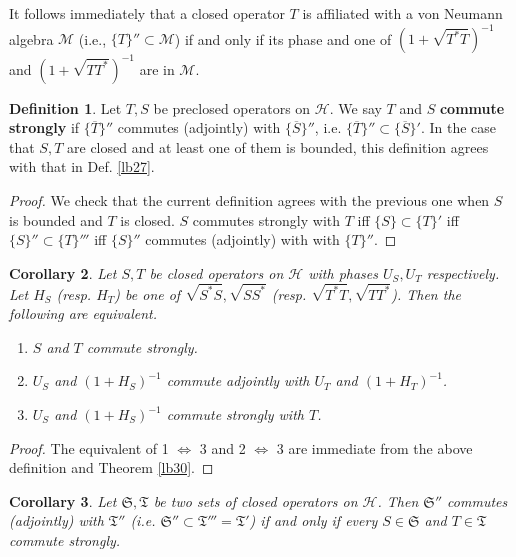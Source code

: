 \documentclass[12pt,a4paper,notitlepage]{article}
\theoremstyle{definition}
\newtheorem{df}{Definition}[section]
\theoremstyle{plain}
\newtheorem{co}[df]{Corollary}
\newcommand{\fk}{\mathfrak}
\newcommand{\mc}{\mathcal}
\newcommand{\ovl}{\overline}
\numberwithin{equation}{section}
\begin{document}
It follows immediately that a closed operator $T$ is affiliated with a von Neumann algebra $\mc M$ (i.e., $\{T\}''\subset\mc M$) if and only if its phase and one of $(1+\sqrt{T^*T})^{-1}$ and $(1+\sqrt{TT^*})^{-1}$ are in $\mc M$. 


 


\begin{df}
Let $T,S$ be preclosed operators on $\mc H$. We say $T$ and $S$ \textbf{commute strongly} if $\{\ovl T\}''$ commutes (adjointly) with $\{\ovl S\}''$, i.e. $\{\ovl T\}''\subset\{\ovl S\}'$. In the case that $S,T$ are closed and at least one of them is bounded, this definition agrees with that in Def. \ref{lb27}.
\end{df}

\begin{proof}
We check that the current definition agrees with the previous one when $S$ is bounded and $T$ is closed. $S$ commutes strongly with $T$ iff $\{S\}\subset\{T\}'$ iff $\{S\}''\subset\{T\}'''$ iff $\{S\}''$ commutes (adjointly) with with $\{T\}''$.
\end{proof}


\begin{co}\label{lb34}
Let $S,T$ be closed operators on $\mc H$ with phases $U_S,U_T$ respectively. Let $H_S$ (resp. $H_T$) be one of $\sqrt{S^*S},\sqrt{SS^*}$ (resp. $\sqrt{T^*T},\sqrt{TT^*}$). Then the following are equivalent.
\begin{enumerate}
\item $S$ and $T$ commute strongly.
\item $U_S$ and $(1+H_S)^{-1}$ commute adjointly with $U_T$ and $(1+H_T)^{-1}$.
\item $U_S$ and $(1+H_S)^{-1}$ commute strongly with $T$.
\end{enumerate}
\end{co}

\begin{proof}
The equivalent of 1 $\Leftrightarrow$ 3 and 2 $\Leftrightarrow$ 3 are immediate from the above definition and Theorem \ref{lb30}.
\end{proof}


\begin{co}\label{lb61}
Let $\fk S,\fk T$ be two sets of closed operators on $\mc H$. Then $\fk S''$ commutes (adjointly) with $\fk T''$ (i.e. $\fk S''\subset\fk T'''=\fk T'$) if and only if every $S\in\fk S$ and $T\in\fk T$ commute strongly.
\end{co}
\end{document}
